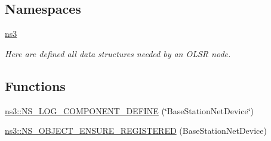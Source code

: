 \subsection*{Namespaces}
\begin{DoxyCompactItemize}
\item 
 \hyperlink{namespacens3}{ns3}
\begin{DoxyCompactList}\small\item\em Here are defined all data structures needed by an O\+L\+SR node. \end{DoxyCompactList}\end{DoxyCompactItemize}
\subsection*{Functions}
\begin{DoxyCompactItemize}
\item 
\hyperlink{namespacens3_a6741a9def32542c8fa5c878e6bc5f068}{ns3\+::\+N\+S\+\_\+\+L\+O\+G\+\_\+\+C\+O\+M\+P\+O\+N\+E\+N\+T\+\_\+\+D\+E\+F\+I\+NE} (\char`\"{}Base\+Station\+Net\+Device\char`\"{})
\item 
\hyperlink{namespacens3_aa42b01f8c15dd3a2da2daa9fa4849a46}{ns3\+::\+N\+S\+\_\+\+O\+B\+J\+E\+C\+T\+\_\+\+E\+N\+S\+U\+R\+E\+\_\+\+R\+E\+G\+I\+S\+T\+E\+R\+ED} (Base\+Station\+Net\+Device)
\end{DoxyCompactItemize}
